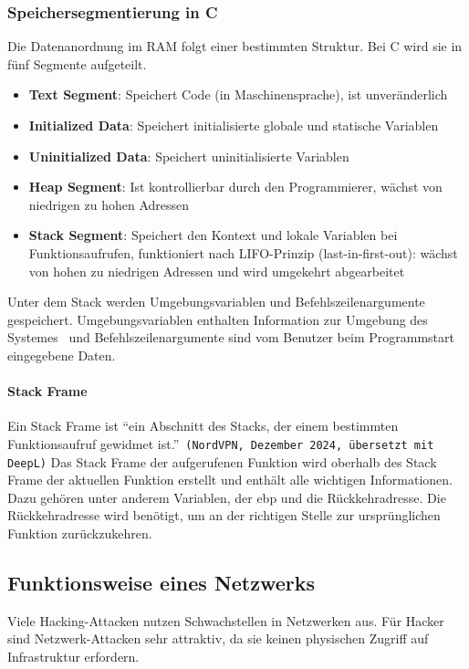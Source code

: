 \documentclass[11pt, a4paper]{article}
\begin{document}
\subsubsection{Speichersegmentierung in C}
Die Datenanordnung im RAM folgt einer bestimmten Struktur. Bei C wird sie in fünf Segmente aufgeteilt.
\begin{itemize}
	\item \textbf{Text Segment}: Speichert Code (in Maschinensprache), ist unveränderlich
	\item \textbf{Initialized Data}: Speichert initialisierte globale und statische Variablen
	\item \textbf{Uninitialized Data}: Speichert uninitialisierte Variablen
	\item \textbf{Heap Segment}: Ist kontrollierbar durch den Programmierer, wächst von niedrigen zu hohen Adressen~\cite{StackHeapYoutube:online}
	\item \textbf{Stack Segment}: Speichert den Kontext und lokale Variablen bei Funktionsaufrufen, funktioniert nach LIFO-Prinzip (last-in-first-out): wächst von hohen zu niedrigen Adressen und wird umgekehrt abgearbeitet~\cite{StackHeapYoutube:online}
\end{itemize}
Unter dem Stack werden Umgebungsvariablen und Befehlszeilenargumente gespeichert. Umgebungsvariablen enthalten Information zur Umgebung des Systemes~\cite{UmgebungsMicrosoft:online} und Befehlszeilenargumente sind vom Benutzer beim Programmstart eingegebene Daten.

\paragraph{Stack Frame}
Ein Stack Frame ist ``ein Abschnitt des Stacks, der einem bestimmten Funktionsaufruf gewidmet ist.''~\texttt{(NordVPN, Dezember 2024, übersetzt mit DeepL)}\cite{StackFrameNordVPN:online} Das Stack Frame der aufgerufenen Funktion wird oberhalb des Stack Frame der aktuellen Funktion erstellt und enthält alle wichtigen Informationen. Dazu gehören unter anderem Variablen, der \gls{ebp} und die Rückkehradresse. Die Rückkehradresse wird benötigt, um an der richtigen Stelle zur ursprünglichen Funktion zurückzukehren.

\subsection{Funktionsweise eines Netzwerks}
Viele Hacking-Attacken nutzen Schwachstellen in Netzwerken aus. Für Hacker sind Netzwerk-Attacken sehr attraktiv, da sie keinen physischen Zugriff auf Infrastruktur erfordern.
\end{document}
